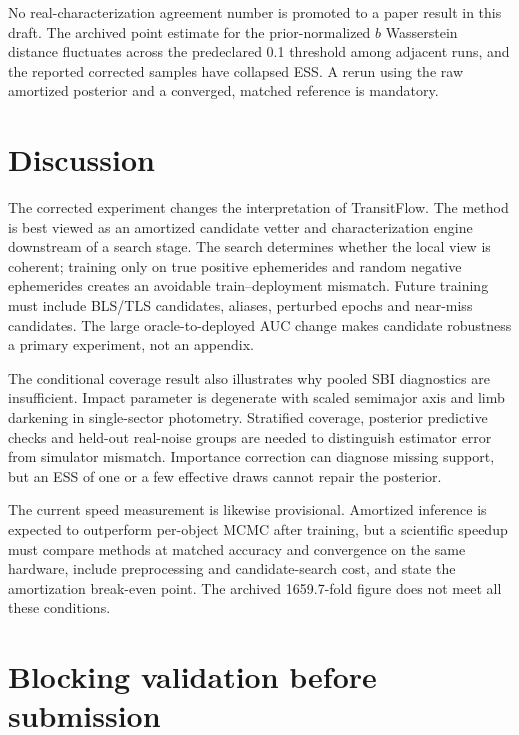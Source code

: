 \documentclass[fleqn,usenatbib]{mnras}
\begin{document}
No real-characterization agreement number is promoted to a paper result in this
draft. The archived point estimate for the prior-normalized $b$ Wasserstein
distance fluctuates across the predeclared 0.1 threshold among adjacent runs,
and the reported corrected samples have collapsed ESS. A rerun using the raw
amortized posterior and a converged, matched reference is mandatory.

\section{Discussion}
\label{sec:discussion}

The corrected experiment changes the interpretation of TransitFlow. The method
is best viewed as an amortized candidate vetter and characterization engine
downstream of a search stage. The search determines whether the local view is
coherent; training only on true positive ephemerides and random negative
ephemerides creates an avoidable train--deployment mismatch. Future training
must include BLS/TLS candidates, aliases, perturbed epochs and near-miss
candidates. The large oracle-to-deployed AUC change makes candidate robustness a
primary experiment, not an appendix.

The conditional coverage result also illustrates why pooled SBI diagnostics are
insufficient. Impact parameter is degenerate with scaled semimajor axis and limb
darkening in single-sector photometry. Stratified coverage, posterior predictive
checks and held-out real-noise groups are needed to distinguish estimator error
from simulator mismatch. Importance correction can diagnose missing support, but
an ESS of one or a few effective draws cannot repair the posterior.

The current speed measurement is likewise provisional. Amortized inference is
expected to outperform per-object MCMC after training, but a scientific speedup
must compare methods at matched accuracy and convergence on the same hardware,
include preprocessing and candidate-search cost, and state the amortization
break-even point. The archived 1659.7-fold figure does not meet all these
conditions.

\section{Blocking validation before submission}
\label{sec:blockers}
\end{document}
